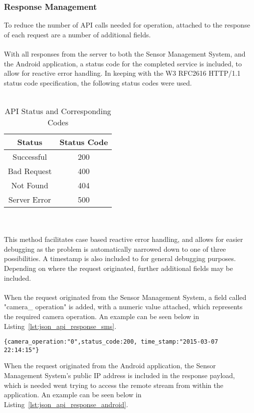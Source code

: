 \documentclass{article}
\begin{document}
\subsubsection{Response Management}
\label{sssec:api_response_mgmt}
To reduce the number of API calls needed for operation, attached to the response of each request are a number of additional fields. \\\\
With all responses from the server to both the Sensor Management System, and the Android application, a status code for the completed service is included, to allow for reactive error handling. In keeping with the W3 RFC2616 HTTP/1.1 status code specification, the following status codes were used. \\\\
\begin{table}[h!]
\def\arraystretch{2}%
\begin{center}
 \begin{tabular}{|| c | c ||} 
 \hline
 \textbf{Status} & \textbf{Status Code}  \\ [0.5ex] 
 \hline\hline
 Successful & 200 \\ 
 \hline
 Bad Request & 400 \\
 \hline
 Not Found & 404 \\
 \hline
 Server Error & 500 \\ [1ex] 
 \hline
 
\end{tabular}
\end{center}
\caption{API Status and Corresponding Codes}
\end{table}
\\\\
This method facilitates case based reactive error handling, and allows for easier debugging as the problem is automatically narrowed down to one of three possibilities. A timestamp is also included to for general debugging purposes. Depending on where the request originated, further additional fields may be included. \\\\
When the request originated from the Sensor Management System, a field called "camera\_ operation" is added, with a numeric value attached, which represents the required camera operation. An example can be seen below in Listing~\ref{lst:json_api_response_sms}.
\begin{lstlisting}[caption={JSON API Response to Sensor Management System},label={lst:json_api_response_sms}]
{camera_operation:"0",status_code:200, time_stamp:"2015-03-07 22:14:15"}
\end{lstlisting}
When the request originated from the Android application, the Sensor Management System’s public IP address is included in the response payload, which is needed went trying to access the remote stream from within the application. An example can be seen below in Listing~\ref{lst:json_api_response_android}.
\end{document}
